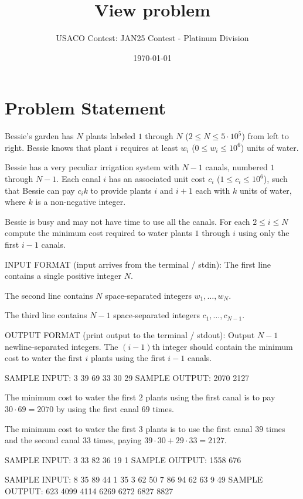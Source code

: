 \documentclass[12pt]{article}
\title{View problem}
\author{USACO Contest: JAN25 Contest - Platinum Division}
\date{\today}
\begin{document}
\maketitle

\section*{Problem Statement}


Bessie's garden has $N$ plants labeled $1$ through $N$
($2\leq N\leq 5\cdot 10^5$) from left to right. Bessie knows that plant $i$
requires at least $w_i$ ($0\leq w_i \leq 10^6$) units of water.

Bessie has a very peculiar irrigation system with $N-1$ canals, numbered $1$
through $N-1$.  Each canal $i$ has an associated unit cost $c_i$
($1\le c_i\le 10^6$), such that Bessie can pay $c_i k$ to provide plants $i$ and
$i+1$ each with $k$ units of water, where $k$ is a non-negative integer.

Bessie is busy and may not have time to use all the canals. For each
$2\leq i \leq N$ compute the minimum cost required to water plants $1$ through
$i$ using only the first $i-1$ canals.

INPUT FORMAT (input arrives from the terminal / stdin):
The first line contains a single positive integer $N$.

The second line contains $N$ space-separated integers $w_1, \ldots, w_N$.

The third line contains $N-1$ space-separated integers $c_1, \ldots, c_{N-1}$.

OUTPUT FORMAT (print output to the terminal / stdout):
Output $N-1$ newline-separated integers. The $(i-1)$th integer should contain
the minimum cost to water the first $i$ plants using the first $i-1$ canals.

SAMPLE INPUT:
3
39 69 33
30 29
SAMPLE OUTPUT: 
2070
2127

The minimum cost to water the first $2$ plants using the first canal is to pay
$30 \cdot 69 = 2070$ by using the first canal $69$ times.

The minimum cost to water the first $3$ plants is to use the first canal $39$
times and the second canal $33$ times, paying
$39 \cdot 30 + 29 \cdot 33 = 2127$.

SAMPLE INPUT:
3
33 82 36
19 1
SAMPLE OUTPUT: 
1558
676

SAMPLE INPUT:
8
35 89 44 1 35 3 62 50
7 86 94 62 63 9 49
SAMPLE OUTPUT: 
623
4099
4114
6269
6272
6827
8827
\end{document}

